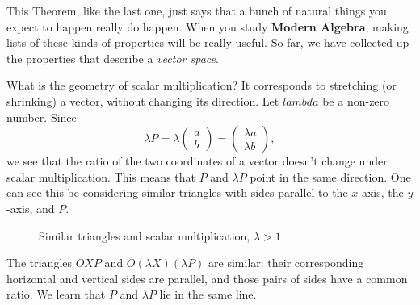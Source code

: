 \documentclass[00-livre-main.tex]{subfiles}
\begin{document}
This Theorem, like the last one, just says that a bunch of natural things you expect to happen really do happen. When you study \textbf{Modern Algebra}, making lists of these kinds of properties will be really useful. So far, we have collected up the properties that describe a \emph{vector space}.


What is the geometry of scalar multiplication? 
It corresponds to stretching (or shrinking) a vector, without changing its direction.
Let $lambda$ be a non-zero number. Since 
\[
\lambda P = \lambda \begin{pmatrix} a \\ b \end{pmatrix} = \begin{pmatrix} \lambda a \\ \lambda b\end{pmatrix},
\]
we see that the ratio of the two coordinates of a vector doesn't change under scalar multiplication. This means that $P$ and $\lambda P$ point in the same direction.
One can see this be considering similar triangles with sides parallel to the $x$-axis, the $y$-axis, and $P$.

\begin{figure}[h!]
\centering
{}
\caption{Similar triangles and scalar multiplication, $\lambda >1$}
\label{fig:sim-tri}
\end{figure}

The triangles $OXP$ and $O(\lambda X)(\lambda P)$ are similar: their corresponding horizontal and vertical sides are parallel, and those pairs of sides have a common ratio. 
We learn that $P$ and $\lambda P$ lie in the same line.
\end{document}
